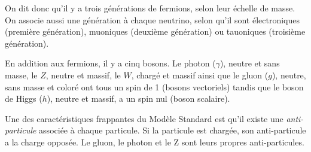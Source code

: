 On dit donc qu'il y a trois générations de fermions, selon leur
échelle de masse. On associe aussi une génération à chaque neutrino,
selon qu'il sont électroniques (première génération), muoniques
(deuxième génération) ou tauoniques (troisième génération).


En addition aux fermions, il y a cinq bosons. Le photon ($\gamma$),
neutre et sans masse, le $Z$, neutre et massif, le $W$, chargé et
massif ainsi que le gluon ($g$), neutre, sans masse et coloré ont tous
un spin de 1 (bosons vectoriels) tandis que le boson de Higgs ($h$),
neutre et massif, a un spin nul (boson scalaire).

Une des caractéristiques frappantes du Modèle Standard est qu'il existe
une \emph{anti-particule} associée à chaque particule. Si la particule
est chargée, son anti-particule a la charge opposée. Le gluon, le
photon et le Z sont leurs propres anti-particules.

